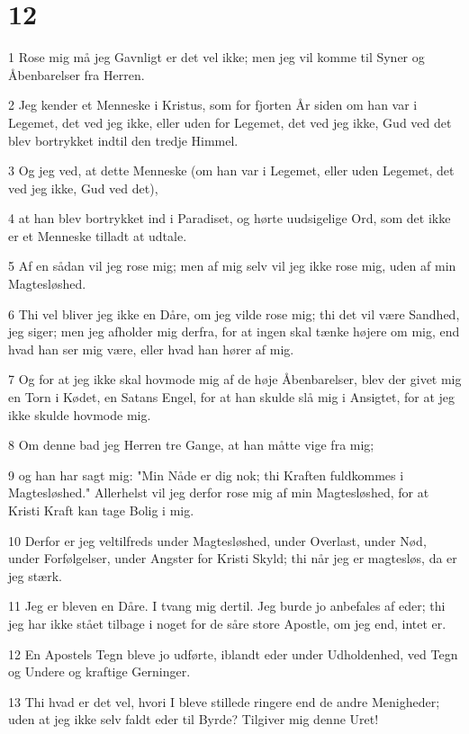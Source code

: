 \chapter{12}

\par 1 Rose mig må jeg Gavnligt er det vel ikke; men jeg vil komme til Syner og Åbenbarelser fra Herren.
\par 2 Jeg kender et Menneske i Kristus, som for fjorten År siden om han var i Legemet, det ved jeg ikke, eller uden for Legemet, det ved jeg ikke, Gud ved det blev bortrykket indtil den tredje Himmel.
\par 3 Og jeg ved, at dette Menneske (om han var i Legemet, eller uden Legemet, det ved jeg ikke, Gud ved det),
\par 4 at han blev bortrykket ind i Paradiset, og hørte uudsigelige Ord, som det ikke er et Menneske tilladt at udtale.
\par 5 Af en sådan vil jeg rose mig; men af mig selv vil jeg ikke rose mig, uden af min Magtesløshed.
\par 6 Thi vel bliver jeg ikke en Dåre, om jeg vilde rose mig; thi det vil være Sandhed, jeg siger; men jeg afholder mig derfra, for at ingen skal tænke højere om mig, end hvad han ser mig være, eller hvad han hører af mig.
\par 7 Og for at jeg ikke skal hovmode mig af de høje Åbenbarelser, blev der givet mig en Torn i Kødet, en Satans Engel, for at han skulde slå mig i Ansigtet, for at jeg ikke skulde hovmode mig.
\par 8 Om denne bad jeg Herren tre Gange, at han måtte vige fra mig;
\par 9 og han har sagt mig: "Min Nåde er dig nok; thi Kraften fuldkommes i Magtesløshed." Allerhelst vil jeg derfor rose mig af min Magtesløshed, for at Kristi Kraft kan tage Bolig i mig.
\par 10 Derfor er jeg veltilfreds under Magtesløshed, under Overlast, under Nød, under Forfølgelser, under Angster for Kristi Skyld; thi når jeg er magtesløs, da er jeg stærk.
\par 11 Jeg er bleven en Dåre. I tvang mig dertil. Jeg burde jo anbefales af eder; thi jeg har ikke stået tilbage i noget for de såre store Apostle, om jeg end, intet er.
\par 12 En Apostels Tegn bleve jo udførte, iblandt eder under Udholdenhed, ved Tegn og Undere og kraftige Gerninger.
\par 13 Thi hvad er det vel, hvori I bleve stillede ringere end de andre Menigheder; uden at jeg ikke selv faldt eder til Byrde? Tilgiver mig denne Uret!
